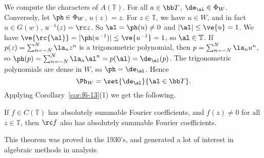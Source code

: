 We compute the characters of $A(\mathbb T)$. For all $a\in \bb T$, $\de_{\al}\in \Phi_W$. Conversely, let $\ph\in \Phi_W$, $u(z)=z$. For $z\in \mathbb T$, we have $u\in W$, and in fact $u\in G(w)$, $u^{-1}(z)=\rc z$. So $\al=\ph(u)\ne 0$ and $|\al|\le \ve{u}=1$. We have $\ve{\rc{\al}}=|\ph(u^{-1})|\le \ve{u^{-1}}=1$, so $\al\in \mathbb T$. If $p(z)=\sum_{n=-N}^N \la_nz^n$ is a trigonometric polynomial, then $p=\sum_{n=-N}^N\la_n u^n$, so $\ph(p)=\sum_{n=-N}^N\la_n\al^n=p(\al)=\de_{\al}(p)$. The trigonometric polynomials are dense in $W$, so $\ph=\de_{\al}$. Hence
\[\Ph_W=\set{\de_{\al}}{\al\in \bb T}.\] Applying Corollary~\ref{cor:f6-13}(1) we get the following.
\begin{thm}
If $f\in C(\mathbb T)$ has absolutely summable Fourier coefficients, and $f(z)\ne 0$ for all $z\in \mathbb T$, then $\rc f$ also has absolutely summable Fourier coefficients.
\end{thm}
This theorem was proved in the 1930's, and generated a lot of interest in algebraic methods in analysis.

